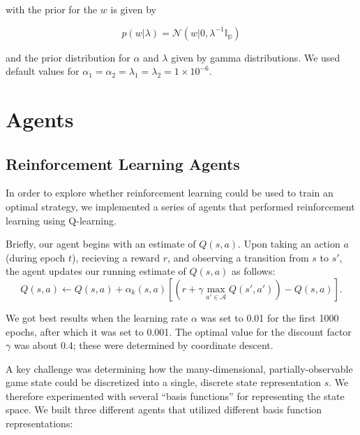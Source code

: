 \documentclass[11pt]{amsart}
\begin{document}
with the prior for the $w$ is given by

$$ p(w | \lambda) = \mathcal{N}(w | 0, \lambda^{-1}\mathbb{I_p}) $$

and the prior distribution for $\alpha$ and $\lambda$ given by gamma distributions. We used default values for $\alpha_1 = \alpha_2 = \lambda_1 = \lambda_2 = 1 \times 10^{-6}$.


\section{Agents}

\subsection{Reinforcement Learning Agents}

In order to explore whether reinforcement learning could be used to train an optimal strategy, we implemented a series of agents that performed reinforcement learning using Q-learning.

Briefly, our agent begins with an estimate of $Q(s,a)$. Upon taking an action $a$ (during epoch $t$), recieving a reward $r$, and observing a transition from $s$
to $s'$, the agent updates our running estimate of $Q(s,a)$ as follows:
$$Q(s,a) \gets Q(s,a) + \alpha_k(s,a) \left[ (r + \gamma \max_{a' \in \mathcal{A}} Q(s', a')) - Q(s,a) \right].$$

We got best results when the learning rate $\alpha$ was set to 0.01 for the first 1000 epochs, after which it was set to 0.001. The optimal value for the discount factor $\gamma$ was about 0.4; these were determined by coordinate descent. 

A key challenge was determining how the many-dimensional, partially-observable game state could be discretized into a single, discrete state representation $s$. We therefore experimented with several ``basis functions'' for representing the state space. We built three different agents that utilized different basis function representations:
\end{document}
